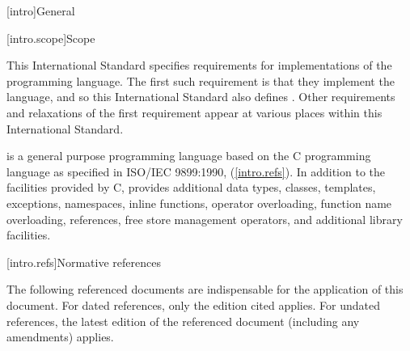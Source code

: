 [intro]{General}

%
%
%
%
%
%
%
%
%
%
%
%
%
%
%
%
%
%
%

[intro.scope]{Scope}

\pnum
{}%
This International Standard specifies requirements for implementations
of the \Cpp programming language. The first such requirement is that
they implement the language, and so this International Standard also
defines \Cpp. Other requirements and relaxations of the first
requirement appear at various places within this International Standard.

\pnum
\Cpp is a general purpose programming language based on the C
programming language as specified in ISO/IEC 9899:1990,
 (\ref{intro.refs}). In addition to
the facilities provided by C, \Cpp provides additional data types,
classes, templates, exceptions, namespaces, inline functions, operator
overloading, function name overloading, references, free store
management operators, and additional library facilities.%

[intro.refs]{Normative references}

\pnum
{}%
The following referenced documents are indispensable for the application
of this document. For dated references, only the edition cited applies.
For undated references, the latest edition of the referenced document
(including any amendments) applies.

